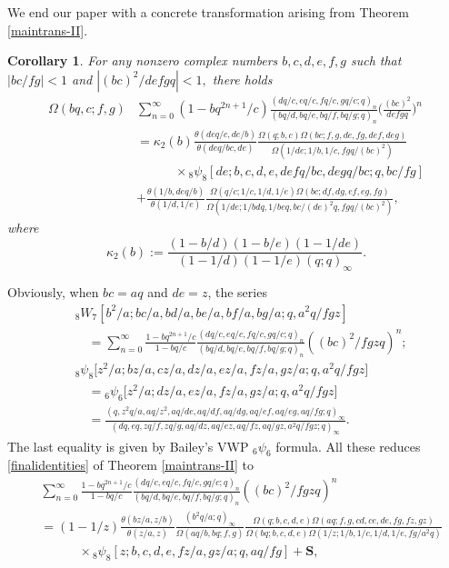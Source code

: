 \documentclass[xits,review,sort&compress]{elsarticle}
\newtheorem{tl}[dl]{Corollary}
\numberwithin{equation}{section}
\newcommand{\poq}[2]{(#1;q)_{#2}}
\def\pf{\noindent {\it Proof.} }
\begin{document}
We end our paper  with  a concrete transformation  arising from Theorem \ref{maintrans-II}.
\begin{tl}For any nonzero complex numbers $b,c,d,e,f,g$ such that $|bc/fg|<1$ and $|(bc)^{2}/defgq|<1,$ there holds
\begin{align}
 \Omega(bq,c;f,g)&\sum_{n=0}^\infty(1-bq^{2n+1}/c)\frac{\poq{dq/c, eq /c, fq /c, gq /c }{n}}{\poq{bq/d, bq /e, bq /f, bq /g }{n}}\bigg(\frac{(bc)^{2}}{defgq}\bigg)^n\nonumber\\
 &=\kappa_2(b)
\frac{\theta(deq/c,de/b)}{\theta(deq/bc,de)}\frac{\Omega(q;b,c)\Omega(bc;f,g,de,fg, def,deg)}{\Omega(1/de;1/b,1/c,fgq/(bc)^{2})}\nonumber\\
 &\qquad\quad\times {}_{8} \psi_{8}[de; b, c, d, e, defq/bc, degq/bc ; q, bc/ f g]\label{finalidentities-222}\\
 &+\frac{\theta(1/b,deq/b)}{\theta(1/d,1/e)}\frac{\Omega(q/c;1/c,1/d,1/e)\Omega(bc;d f,d g,e f,e g,f g)}{\Omega(1/de;1/bdq,
1/beq,bc/(de)^2q,fgq/(bc)^{2})},\nonumber
 \end{align}
where \[\kappa_2(b):=\frac{(1-b/d)(1-b/e)(1-1/de)}{(1-1/d)(1-1/e)\poq{q}{\infty}}.\]
\end{tl}
\pf Obviously,  when $bc=aq$ and $de=z$,  the series
\begin{align*}
 &{}_{8}W_{7}\left[b^{2} / a ; b c / a, b d / a, b e / a, b f / a, b g / a ; q, a^{2}q / fgz\right]
\nonumber\\
&\quad=\sum_{n=0}^\infty\frac{1-bq^{2n+1}/c}{1-bq/c}\frac{\poq{dq/c, eq /c, fq /c, gq /c }{n}}{\poq{bq/d, bq /e, bq /f, bq /g }{n}}((bc)^{2}/ fgzq)^n;\\
 &{}_{8}\psi_{8}\big[z^2/a;bz/a,cz/a,dz/a,
ez/a,fz/a,gz/a;q,a^2q/fgz\big]\nonumber\\
&\quad={}_{6}\psi_{6}\big[z^2/a;dz/a,
ez/a,fz/a,gz/a;q,a^2q/fgz\big]\\
&\quad=\frac{\poq{q,z^2q/a,aq/z^2,aq/de,aq/d f,aq/d g,aq/e f,aq/e g,aq/f g}{\infty}}{\poq{dq,eq,zq/f,zq/g,aq/dz,aq/ez,aq/fz,aq/g z,a^2 q/f gz}{\infty}}.
\end{align*}
The last equality is given by Bailey's VWP ${}_6\psi_6$ formula. All these reduces \eqref{finalidentities} of   Theorem \ref{maintrans-II} to
\begin{align*}
 &\sum_{n=0}^\infty\frac{1-bq^{2n+1}/c}{1-bq/c}\frac{\poq{dq/c, eq /c, fq /c, gq /c }{n}}{\poq{bq/d, bq /e, bq /f, bq /g }{n}}((bc)^{2}/ fgzq)^n\\
 &=(1-1/z)
\frac{\theta(bz/a,z/b)}{\theta(z/a,z)}\frac{(b^2 q/a; q)_{\infty}}{\Omega(aq/b, bq;f,g)}\frac{\Omega(q;b,c,d,e)\Omega(aq;f,g,cd,ce,de,fg, fz,gz)}{\Omega( bq;b,c,d,e)\Omega(1/z;1/b,1/c,1/d,
 1/e,fg/a^{2}q )}\nonumber\\
 &\qquad\quad\times {}_{8} \psi_{8}[z ; b, c, d, e, fz/ a, gz / a ; q, aq / f g]+\mathbf{S},
 \end{align*}
\end{document}
